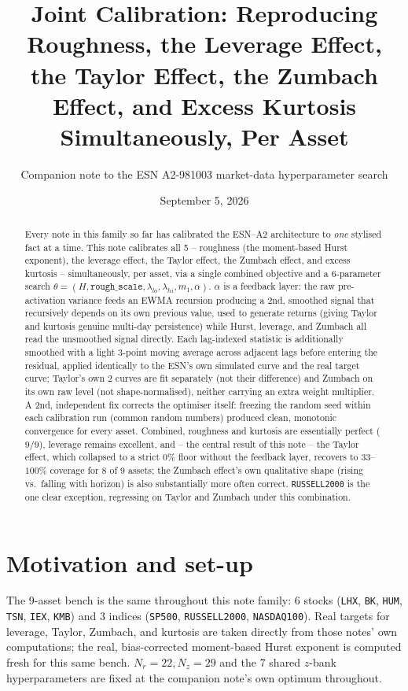 \documentclass[11pt]{article}
\title{Joint Calibration: Reproducing Roughness, the Leverage Effect,\\
the Taylor Effect, the Zumbach Effect, and Excess Kurtosis\\
Simultaneously, Per Asset}
\author{Companion note to the ESN A2-981003 market-data hyperparameter search}
\date{September 5, 2026}
\begin{document}
\maketitle

\begin{abstract}
Every note in this family so far has calibrated the ESN--A2 architecture to
\emph{one} stylised fact at a time. This note calibrates all 5 --
roughness (the moment-based Hurst exponent), the leverage effect, the
Taylor effect, the Zumbach effect, and excess kurtosis -- simultaneously,
per asset, via a single combined objective and a 6-parameter search
$\theta=(H,\texttt{rough\_scale},\lambda_{lo},\lambda_{hi},m_1,\alpha)$.
$\alpha$ is a feedback layer: the raw pre-activation variance feeds an
EWMA recursion producing a 2nd, smoothed signal that recursively depends
on its own previous value, used to generate returns (giving Taylor and
kurtosis genuine multi-day persistence) while Hurst, leverage, and
Zumbach all read the unsmoothed signal directly. Each lag-indexed
statistic is additionally smoothed with a light 3-point moving average
across adjacent lags before entering the residual, applied identically to
the ESN's own simulated curve and the real target curve; Taylor's own 2
curves are fit separately (not their difference) and Zumbach on its own
raw level (not shape-normalised), neither carrying an extra weight
multiplier. A 2nd, independent fix corrects the optimiser itself: freezing
the random seed within each calibration run (common random numbers)
produced clean, monotonic convergence for every asset. Combined,
roughness and kurtosis are essentially perfect ($9/9$), leverage remains
excellent, and -- the central result of this note -- the Taylor effect,
which collapsed to a strict $0\%$ floor without the feedback layer,
recovers to $33$--$100\%$ coverage for 8 of 9 assets; the Zumbach effect's
own qualitative shape (rising vs.\ falling with horizon) is also
substantially more often correct. \texttt{RUSSELL2000} is the one clear
exception, regressing on Taylor and Zumbach under this combination.
\end{abstract}

\tableofcontents

\section{Motivation and set-up}
The 9-asset bench is the same throughout this note family: 6 stocks
(\texttt{LHX}, \texttt{BK}, \texttt{HUM}, \texttt{TSN}, \texttt{IEX},
\texttt{KMB}) and 3 indices (\texttt{SP500}, \texttt{RUSSELL2000},
\texttt{NASDAQ100}). Real targets for leverage, Taylor, Zumbach, and
kurtosis are taken directly from those notes' own computations; the real,
bias-corrected moment-based Hurst exponent is computed fresh for this same
bench. $N_r=22,N_z=29$ and the 7 shared $z$-bank hyperparameters are fixed
at the companion note's own optimum throughout.
\end{document}
